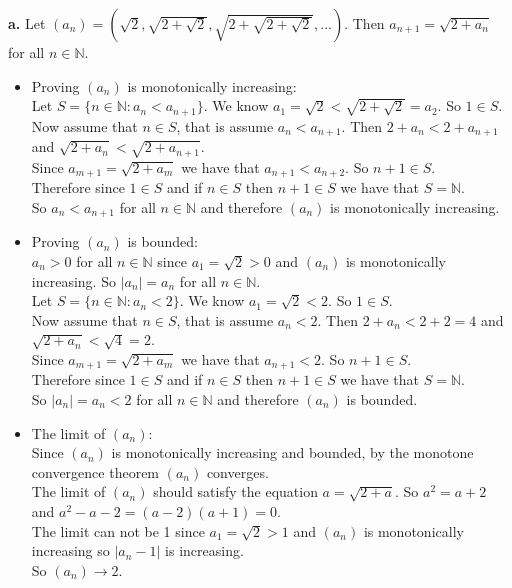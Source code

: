 \documentclass{article}
\begin{document}
{\Large \textbf{a.}} Let $(a_n) = (\sqrt{2}, \sqrt{2 + \sqrt{2}}, \sqrt{2 + \sqrt{2 + \sqrt{2}}}, ...)$. Then $a_{n+1} = \sqrt{2 + a_n}$ for all $n\in\mathbb{N}$.
\begin{center}
    \doublespacing
    \begin{itemize}
        \item Proving $(a_n)$ is monotonically increasing:
        \\Let $S = \{n\in\mathbb{N} : a_n < a_{n+1}\}$. We know $a_1 = \sqrt{2} < \sqrt{2 + \sqrt{2}} = a_2$. So $1\in S$.
        \\Now assume that $n\in S$, that is assume $a_{n} < a_{n+1}$. Then $2 + a_n < 2 + a_{n+1}$ and $\sqrt{2 + a_n} <\sqrt{2 + a_{n+1}}$. 
        \\Since $a_{m+1} = \sqrt{2 + a_m}$ we have that $a_{n+1} < a_{n+2}$. So $n + 1\in S$.
        \\Therefore since $1\in S$ and if $n\in S$ then $n + 1\in S$ we have that $S =\mathbb{N}$.
        \\So $a_n < a_{n+1}$ for all $n\in\mathbb{N}$ and therefore $(a_n)$ is monotonically increasing.
        \item Proving $(a_n)$ is bounded:
        \\$a_n > 0$ for all $n\in\mathbb{N}$ since $a_1 =\sqrt{2} > 0$ and $(a_n)$ is monotonically increasing. So $|a_n| = a_n$ for all $n\in\mathbb{N}$.
        \\Let $S = \{n\in\mathbb{N} : a_n < 2\}$. We know $a_1 = \sqrt{2} < 2$. So $1\in S$.
        \\Now assume that $n\in S$, that is assume $a_{n} < 2$. Then $2 + a_n < 2 + 2 = 4$ and $\sqrt{2 + a_n} <\sqrt{4} = 2$. 
        \\Since $a_{m+1} = \sqrt{2 + a_m}$ we have that $a_{n+1} < 2$. So $n + 1\in S$.
        \\Therefore since $1\in S$ and if $n\in S$ then $n + 1\in S$ we have that $S =\mathbb{N}$.
        \\So $|a_n| = a_n < 2$ for all $n\in\mathbb{N}$ and therefore $(a_n)$ is bounded.
        \item The limit of $(a_n)$:
        \\Since $(a_n)$ is monotonically increasing and bounded, by the monotone convergence theorem $(a_n)$ converges.
        \\The limit of $(a_n)$ should satisfy the equation $a =\sqrt{2 + a}$. So $a^2 = a + 2$ and $a^2 - a - 2 = (a - 2)(a + 1) = 0$.
        \\The limit can not be 1 since $a_1 = \sqrt{2} > 1$ and $(a_n)$ is monotonically increasing so $|a_n - 1|$ is increasing.
        \\So $(a_n)\rightarrow 2$.
    \end{itemize}
\end{center}
\end{document}
